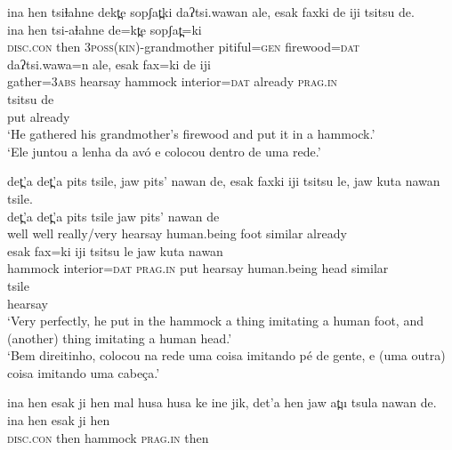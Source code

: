 \documentclass[output=paper,
modfonts,nonflat
]{langsci/langscibook}
\begin{document}
\newpage
\ea ina hen tsiɬahne dekt̪e sopʃat̪ki daʔtsi.wawan ale,  esak faxki de iji tsitsu de.\\[.3em]
\gll ina   hen  tsi-aɬahne  de=kt̪e   sopʃat̪=ki\\       
\textsc{disc.con}  then     \textsc{3poss(kin)}-grandmother  pitiful=\textsc{gen}  firewood=\textsc{dat}\\
    


\gll daʔtsi.wawa=n  ale, esak fax=ki de iji\\
gather=\textsc{3abs}   hearsay   hammock interior=\textsc{dat}  already  \textsc{prag.in}\\



\gll tsitsu  de\\
put      already\\
\glt ‘He gathered his grandmother's firewood and put it in a hammock.'\\
‘Ele juntou a lenha da avó e colocou dentro de uma rede.’{\footnotemark}

\z

\ea det̪'a det̪'a pits tsile, jaw pits' nawan de, esak faxki iji tsitsu le, jaw kuta nawan tsile.\\[.3em]
\gll det̪'a  det̪'a pits tsile jaw  pits'  nawan   de\\     
well    well  really/very  hearsay  human.being  foot   similar   already\\



\gll esak fax=ki  iji  tsitsu le  jaw  kuta  nawan\\
hammock  interior=\textsc{dat}  \textsc{prag.in}  put      hearsay  human.being head  similar\\



\gll tsile\\
hearsay\\
\glt ‘Very perfectly, he put in the hammock a thing imitating a human foot, and (another) thing imitating a human head.'\\
‘Bem direitinho, colocou na rede uma coisa imitando pé de gente, e (uma outra) coisa imitando uma cabeça.’
\z

\ea ina hen esak ji hen mal husa husa ke ine jik, det'a hen jaw at̪u tsula nawan de.\\[.3em]
\gll ina           hen     esak  ji   hen\\     
\textsc{disc.con}  then    hammock  \textsc{prag.in}  then\\     
\end{document}
